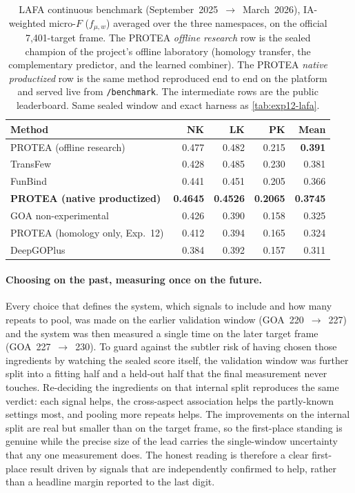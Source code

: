 \begin{table}[htbp]
  \centering
  \caption[LAFA continuous benchmark: the learned re-ranker]{%
    LAFA continuous benchmark (September~2025~$\to$~March~2026), IA-weighted
    micro-$F$ ($f_{\mu,w}$) averaged over the three namespaces, on the official
    7{,}401-target frame. The PROTEA \emph{offline research} row is the sealed
    champion of the project's offline laboratory (homology transfer, the
    complementary predictor, and the learned combiner). The PROTEA
    \emph{native productized} row is the same method reproduced end to end on the
    platform and served live from \texttt{/benchmark}. The intermediate rows are
    the public leaderboard. Same sealed window and exact harness as
    \cref{tab:exp12-lafa}.}
  \label{tab:exp13-lafa}
  \begin{tabular}{l rrr r}
    \toprule
    \textbf{Method} & \textbf{NK} & \textbf{LK} & \textbf{PK} & \textbf{Mean} \\
    \midrule
    PROTEA (offline research)       & 0.477 & 0.482 & 0.215 & \textbf{0.391} \\
    TransFew                        & 0.428 & 0.485 & 0.230 & 0.381 \\
    FunBind                         & 0.441 & 0.451 & 0.205 & 0.366 \\
    \textbf{PROTEA (native productized)} & \textbf{0.4645} & \textbf{0.4526} & \textbf{0.2065} & \textbf{0.3745} \\
    GOA non-experimental            & 0.426 & 0.390 & 0.158 & 0.325 \\
    PROTEA (homology only, Exp.~12) & 0.412 & 0.394 & 0.165 & 0.324 \\
    DeepGOPlus                      & 0.384 & 0.392 & 0.157 & 0.311 \\
    \bottomrule
  \end{tabular}
\end{table}

\paragraph{Choosing on the past, measuring once on the future.}
Every choice that defines the system, which signals to include and how many
repeats to pool, was made on the earlier validation window (GOA~220~$\to$~227) and
the system was then measured a single time on the later target frame
(GOA~227~$\to$~230). To guard against the subtler risk of having chosen those
ingredients by watching the sealed score itself, the validation window was further
split into a fitting half and a held-out half that the final measurement never
touches. Re-deciding the ingredients on that internal split reproduces the same
verdict: each signal helps, the cross-aspect association helps the partly-known
settings most, and pooling more repeats helps. The improvements on the internal
split are real but smaller than on the target frame, so the first-place standing
is genuine while the precise size of the lead carries the single-window
uncertainty that any one measurement does. The honest reading is therefore a clear
first-place result driven by signals that are independently confirmed to help,
rather than a headline margin reported to the last digit.

